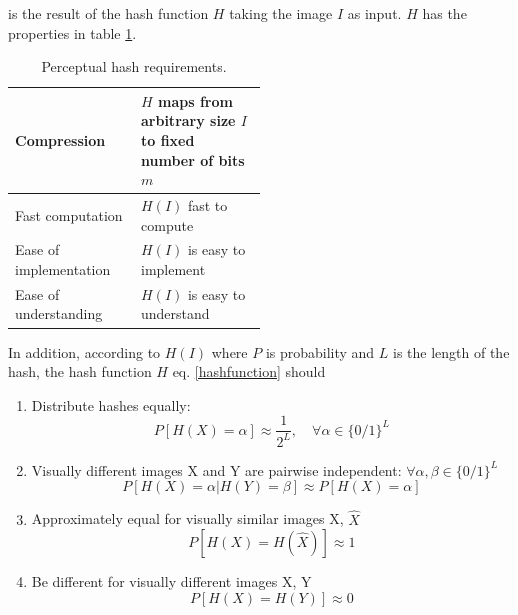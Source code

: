 \documentclass[english,12pt,a4paper,pdftex,elec,utf8]{aaltothesis}
\begin{document}
is the result of the hash function $H$ taking the image $I$ as input. $H$ has the properties in table \ref{hashcriteria}.

\def\arraystretch{1.5}
\begin{table}[htb]
\caption{Perceptual hash requirements. \cite{Zauner2010}}
\label{hashcriteria}
\begin{center}
\begin{tabular}{lp{0.5\linewidth}}
  \hline \hline
  Compression & $H$ maps from arbitrary size $I$ to fixed number of bits $m$\\
  \hline
  Fast computation & $H(I)$ fast to compute \\
  \hline
  Ease of implementation & $H(I)$ is easy to implement\\
  \hline
  Ease of understanding & $H(I)$ is easy to understand\\
  \hline
\end{tabular}
\end{center}\end{table}


In addition, according to \cite{mihccak2001new} $H(I)$ where $P$ is probability and $L$ is the length of the hash, the hash function $H$ eq. \ref{hashfunction} should
\begin{enumerate}
\item Distribute hashes equally:\\
  \begin{equation}\label{phashdistribute}
  P[H(X)=\alpha]\approx\frac{1}{2^L},\quad\forall\alpha\in \{0/1\}^L
  \end{equation}
\item Visually different images X and Y are pairwise independent: $\forall\alpha,\beta\in\{0/1\}^L$\\
  \begin{equation}\label{phashindependent}
    P[H(X)=\alpha|H(Y)=\beta]\approx P[H(X)=\alpha]
  \end{equation}
\item Approximately equal for visually similar images X, $\hat{X}$\\
  \begin{equation}\label{phashsame}
    P[H(X) = H(\hat{X})] \approx 1
  \end{equation}

\item Be different for visually different images X, Y\\
  \begin{equation}\label{phashdif}
    P[H(X)=H(Y)]\approx 0
  \end{equation}
\end{enumerate}
\end{document}
